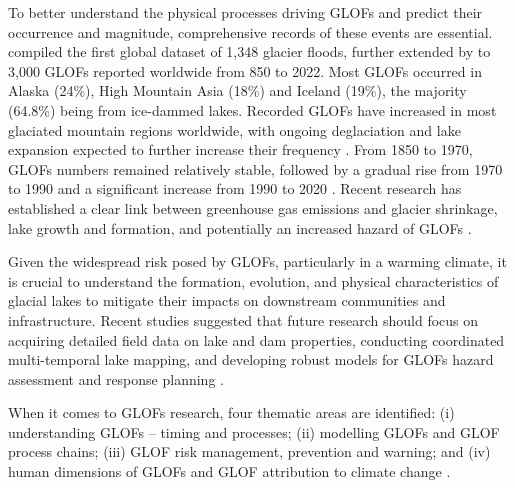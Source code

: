 To better understand the physical processes driving GLOFs and predict their occurrence and magnitude, comprehensive records of these events are essential. \cite{Carrivick&Tweed2016} compiled the first global dataset of 1,348 glacier floods, further extended by \cite{Emmer&al2022, Veh&al2022, Lutzow&al2023} to 3,000 GLOFs reported worldwide from 850 to 2022. Most GLOFs occurred in Alaska (24\%), High Mountain Asia (18\%) and Iceland (19\%), the majority (64.8\%) being from ice-dammed lakes. Recorded GLOFs have increased in most glaciated mountain regions worldwide, with ongoing deglaciation and lake expansion expected to further increase their frequency \cite{Zhang&al2024}. From 1850 to 1970, GLOFs numbers remained relatively stable, followed by a gradual rise from 1970 to 1990 and a significant increase from 1990 to 2020 \citep{Zhang&al2024}. Recent research has established a clear link between greenhouse gas emissions and glacier shrinkage, lake growth and formation, and potentially an increased hazard of GLOFs \citep{Harrison&al2018,Stuart&al2021}.

Given the widespread risk posed by GLOFs, particularly in a warming climate, it is crucial to understand the formation, evolution, and physical characteristics of glacial lakes to mitigate their impacts on downstream communities and infrastructure. Recent studies suggested that future research should focus on acquiring detailed field data on lake and dam properties, conducting coordinated multi-temporal lake mapping, and developing robust models for GLOFs hazard assessment and response planning \citep{Zhang&al2024, Carrivick&Tweed2016, Veh&al2022}.




When it comes to GLOFs research, four thematic areas are identified: (i) understanding GLOFs – timing and processes; (ii) modelling GLOFs and GLOF process chains; (iii) GLOF risk management, prevention and warning; and (iv) human dimensions of GLOFs and GLOF attribution to climate change \citep{Emmer&al2022}. 


